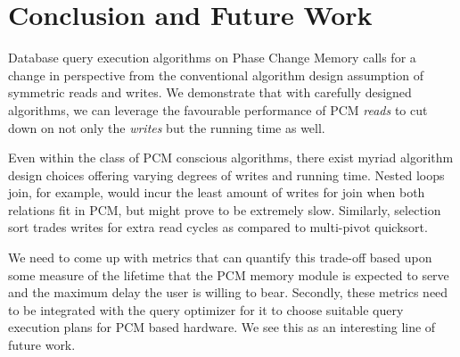 \section{Conclusion and Future Work}
\label{conclusion}
Database query execution algorithms on Phase Change Memory calls for a change in perspective from the conventional algorithm design assumption of symmetric reads and writes. We demonstrate that with carefully designed algorithms, we can leverage the favourable performance of PCM \textit{reads} to cut down on not only the \textit{writes} but the running time as well. 

Even within the class of PCM conscious algorithms, there exist myriad algorithm design choices offering varying degrees of writes and running time. Nested loops join, for example, would incur the least amount of writes for join when both relations fit in PCM, but might prove to be extremely slow. Similarly, selection sort trades writes for extra read cycles as compared to multi-pivot quicksort. 

We need to come up with metrics that can quantify this trade-off based upon some measure of the lifetime that the PCM memory module is expected to serve and the maximum delay the user is willing to bear. Secondly, these metrics need to be integrated with the query optimizer for it to choose suitable query execution plans for PCM based hardware. We see this as an interesting line of future work.
